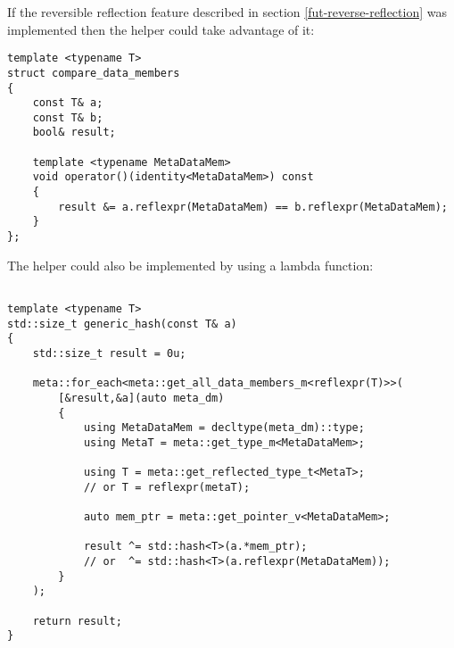 If the reversible reflection feature described in section \ref{fut-reverse-reflection}
was implemented then the helper could take advantage of it:

\begin{verbatim}
template <typename T>
struct compare_data_members
{
	const T& a;
	const T& b;
	bool& result;

	template <typename MetaDataMem>
	void operator()(identity<MetaDataMem>) const
	{
		result &= a.reflexpr(MetaDataMem) == b.reflexpr(MetaDataMem);
	}
};
\end{verbatim}

The helper could also be implemented by using a lambda function:

\begin{verbatim}

template <typename T>
std::size_t generic_hash(const T& a)
{
	std::size_t result = 0u;

	meta::for_each<meta::get_all_data_members_m<reflexpr(T)>>(
		[&result,&a](auto meta_dm)
		{
			using MetaDataMem = decltype(meta_dm)::type;
			using MetaT = meta::get_type_m<MetaDataMem>;

			using T = meta::get_reflected_type_t<MetaT>;
			// or T = reflexpr(metaT);

			auto mem_ptr = meta::get_pointer_v<MetaDataMem>;

			result ^= std::hash<T>(a.*mem_ptr);
			// or  ^= std::hash<T>(a.reflexpr(MetaDataMem));
		}
	);

	return result;
}
\end{verbatim}

